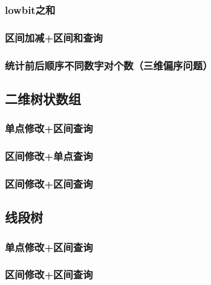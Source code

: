 \documentclass[twoside,a4paper]{article}
\begin{document}
\subsubsection{lowbit之和}


\subsubsection{区间加减+区间和查询}


\subsubsection{统计前后顺序不同数字对个数（三维偏序问题）}



\subsection{二维树状数组}

\subsubsection{单点修改+区间查询}


\subsubsection{区间修改+单点查询}


\subsubsection{区间修改+区间查询}



\subsection{线段树}

\subsubsection{单点修改+区间查询}


\subsubsection{区间修改+区间查询}

\end{document}
